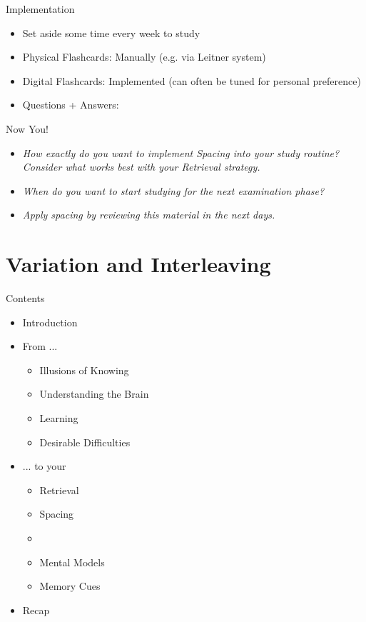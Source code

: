 \documentclass{ercisbeamer}
\begin{document}
\begin{frame}{Implementation}
    \begin{itemize}
        \item Set aside some time every week  to study
        \item Physical Flashcards: Manually (e.g. via Leitner system)
        \item Digital Flashcards: Implemented  (can often be tuned for personal preference)
        \item Questions + Answers: 
    \end{itemize}
\end{frame}

\begin{frame}{Now You!}
    \begin{itemize}
        \item \emph{How exactly do you want to implement Spacing into your study routine? \\ Consider what works best with your Retrieval strategy.}
        \item \emph{When do you want to start studying for the next examination phase?}
        \item \emph{Apply spacing by reviewing this material in the next days.}
    \end{itemize}
\end{frame}

\section{Variation and Interleaving}
\begin{frame}{Contents}
    \begin{itemize}
        \item Introduction
        \item From ...
        \begin{itemize}
            \item Illusions of Knowing
            \item Understanding the Brain
            \item Learning
            \item Desirable Difficulties
        \end{itemize}
        \item ... to your 
        \begin{itemize}
            \item Retrieval
            \item Spacing
            \item {}
            \item Mental Models
            \item Memory Cues
        \end{itemize}
        \item Recap
    \end{itemize}
\end{frame}
\end{document}

